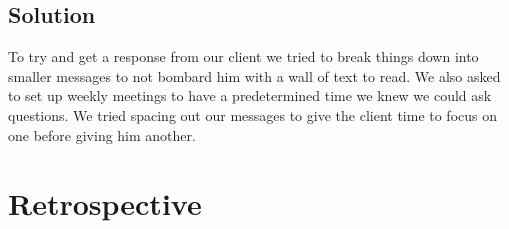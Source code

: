 \documentclass[onecolumn, draftclsnofoot,10pt, compsoc]{IEEEtran}
\begin{document}
    \subsection{Solution}
    To try and get a response from our client we tried to break things down into smaller messages to not bombard him with a wall of text to read. We also asked to set up weekly meetings to have a predetermined time we knew we could ask questions. We tried spacing out our messages to give the client time to focus on one before giving him another. 
    \newpage
\section{Retrospective}

    \begin{longtable}{p{} | p{} | p{} | p{}}
    

\end{longtable}
\end{document}
